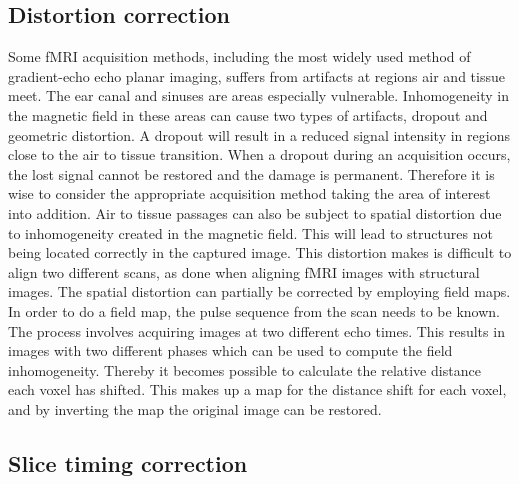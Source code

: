 \subsection{Distortion correction}

Some fMRI acquisition methods, including the most widely used method of gradient-echo echo planar imaging, suffers from artifacts at regions air and tissue meet. The ear canal and sinuses are areas especially vulnerable. Inhomogeneity in the magnetic field in these areas can cause two types of artifacts, dropout and geometric distortion. A dropout will result in a reduced signal intensity in regions close to the air to tissue transition. When a dropout during an acquisition occurs, the lost signal cannot be restored and the damage is permanent. Therefore it is wise to consider the appropriate acquisition method taking the area of interest into addition. Air to tissue passages can also be subject to spatial distortion due to inhomogeneity created in the magnetic field. This will lead to structures not being located correctly in the captured image. This distortion makes is difficult to align two different scans, as done when aligning fMRI images with structural images. 
The spatial distortion can partially be corrected by employing field maps. In order to do a field map, the pulse sequence from the scan needs to be known. The process involves acquiring images at two different echo times. This results in images with two different phases which can be used to compute the field inhomogeneity. Thereby it becomes possible to calculate the relative distance each voxel has shifted. This makes up a map for the distance shift for each voxel, and by inverting the map the original image can be restored.\cite{Poldrack2011}  

\subsection{Slice timing correction} 

